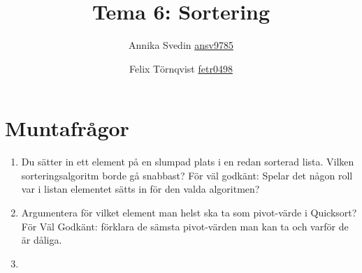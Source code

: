\documentclass[a5paper,10pt,oneside]{article}
\title{Tema 6: Sortering}
\author{Annika Svedin \url{ansv9785} \and Felix Törnqvist \url{fetr0498}}
\begin{document}
\maketitle

\section*{Muntafrågor}

\begin{enumerate}

	\item Du sätter in ett element på en slumpad plats i en redan sorterad lista. Vilken sorteringsalgoritm borde gå snabbast?
		För väl godkänt: Spelar det någon roll var i listan elementet sätts in för den valda algoritmen?	
	
	\item Argumentera för vilket element man helst ska ta som pivot-värde i Quicksort? För Väl Godkänt: förklara de sämsta pivot-värden man kan ta och varför de är dåliga.
	
	\item 
\end{enumerate}
\end{document}
